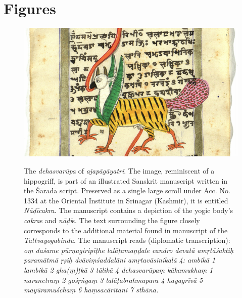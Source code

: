 \section{Figures}

\clearpage

  \begin{figure}[ht]
	\centering
  \includegraphics[width=1\textwidth]{pics/Wolpertinger.png}
\caption[The \textit{dehasvarūpa} of \textit{ajapāgāyatrī}]{The \textit{dehasvarūpa} of \textit{ajapāgāyatrī}. The image, reminiscent of a hippogriff, is part of an illustrated Sanskrit manuscript written in the Śāradā script. Preserved as a single large scroll under Acc. No. 1334 at the Oriental Institute in Srinagar (Kashmir), it is entitled \textit{Nāḍīcakra}. The manuscript contains a depiction of the yogic body’s \textit{cakra}s and \textit{nāḍī}s. The text surrounding the figure closely corresponds to the additional material found in manuscript  of the \textit{Tattvayogabindu}. The manuscript reads (diplomatic transcription): \textit{oṃ daśame pūrṇagiripīṭhe lalāṭamaṇḍale candro devatā amṛtāśaktiḥ paramātmā ṛṣiḥ dvāviṃśaddalāni amṛtavāsinikalā 4: ambikā 1 lambikā 2 gha(ṃ)ṭkā 3 tālikā 4 dehasvarūpaṃ kākamukhaṃ 1 naranetraṃ 2 gośṛṅgaṃ 3 lalāṭabrahmapara 4 hayagrīvā 5 mayūramuśchaṃ 6 haṃsacārītani 7 sthāna.}}
	\label{fig_wolpertinger}
      \end{figure}

      \clearpage

